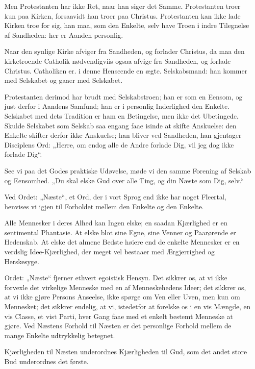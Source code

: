 \documentclass[12pt,a4paper]{book}
\newcommand{\apage}[1]{\marginnote{\footnotesize\textit{[#1]}}}
\begin{document}
Men Protestanten har ikke Ret, naar han siger det Samme. Protestanten troer kun paa Kirken, forsaavidt han troer paa Christus. Protestanten kan ikke lade Kirken troe for sig, han maa, som den Enkelte, selv have Troen i indre Tilegnelse af Sandheden: her er Aanden personlig.

Naar den synlige Kirke afviger fra Sandheden, og forlader Christus, da maa den kirketroende Catholik nødvendigviis ogsaa afvige fra Sandheden, og forlade Christus. Catholiken er. i denne Henseende en ægte. Selskabsmand: han kommer med Selskabet og gaaer med Selskabet.

Protestanten derimod har brudt med Selskabstroen; han er som en Eensom, og just derfor i Aandens Samfund; han er i personlig Inderlighed den Enkelte. Selskabet med dets Tradition er ham en Betingelse, men ikke det Ubetingede. Skulde Selskabet som Selskab saa engang faae isinde at skifte Anskuelse: den Enkelte skifter derfor ikke Anskuelse; han bliver ved Sandheden, han gjentager Disciplens Ord: „Herre, om endog alle de Andre forlade Dig, vil jeg dog ikke forlade Dig“.

See vi paa det Godes praktiske Udøvelse, møde vi den samme Forening af Selskab og Eensomhed. „Du skal elske Gud over alle Ting, og din Næste som Dig, selv.“

Ved Ordet: „Næste“, et Ord, der i vort Sprog end ikke har noget Fleertal, henvises vi igjen til Forholdet mellem den Enkelte og den Enkelte.

Alle Mennesker i deres Alhed kan Ingen elske; en saadan Kjærlighed er en sentimental Phantasie. At elske blot sine Egne, sine Venner og Paarørende er Hedenskab. At elske det almene Bedste høiere end de enkelte Mennesker er en verdslig Idee-Kjærlighed, der meget vel bestaaer med Ærgjerrighed og Herskesyge.

Ordet: „Næste“ fjerner ethvert egoistisk Hensyn. Det sikkrer os, at vi ikke forvexle det virkelige Menneske med en af Menneskehedens Ideer; det sikkrer os, at vi ikke gjøre Persons Anseelse, ikke spørge om Ven eller Uven, men kun om \apage{53}
Mennesket; det sikkrer endelig, at vi, istedetfor at forelske os i en vis Mængde, en vis Classe, et vist Parti, hver Gang faae med et enkelt bestemt Menneske at gjøre. Ved Næstens Forhold til Næsten er det personlige Forhold mellem de mange Enkelte udtrykkelig betegnet.

Kjærligheden til Næsten underordnes Kjærligheden til Gud, som det andet store Bud underordnes det første.
\end{document}
